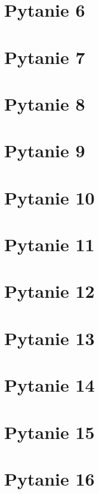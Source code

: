 \documentclass[12pt, a4paper, polish, openany]{book}
\begin{document}
\chapter{Pytanie 6}


\chapter{Pytanie 7}


\chapter{Pytanie 8}


\chapter{Pytanie 9}


\chapter{Pytanie 10}


\chapter{Pytanie 11}


\chapter{Pytanie 12}


\chapter{Pytanie 13}


\chapter{Pytanie 14}


\chapter{Pytanie 15}


\chapter{Pytanie 16}

\end{document}
